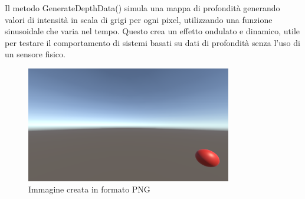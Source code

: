 \documentclass[11pt]{report}
\begin{document}
Il metodo GenerateDepthData() simula una mappa di profondità generando valori di intensità in scala di grigi per ogni pixel, utilizzando una funzione sinusoidale che varia nel tempo. Questo crea un effetto ondulato e dinamico, utile per testare il comportamento di sistemi basati su dati di profondità senza l’uso di un sensore fisico.

\begin{figure}[H]
   \centering
   \includegraphics[width=0.8\textwidth]{images/Immagine4.png}
   \caption{Immagine creata in formato PNG}
   \label{fig:output_image}
\end{figure}
\end{document}
